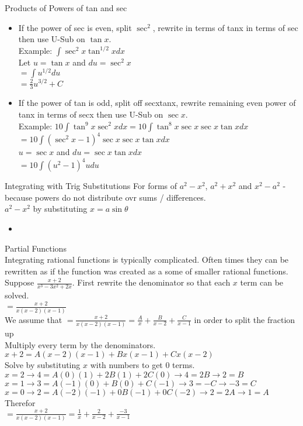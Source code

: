 \documentclass{article}
\begin{document}
\noindent
Products of Powers of tan and sec
\begin{itemize}
  \item If the power of sec is even, split $\sec^2$, rewrite in terms of tanx in terms of sec then use U-Sub on $\tan x$.\\
  Example: $\int{\sec^2x\tan^{1/2}x dx}$\\
  Let $u = \tan{x}$ and $du = \sec^2{x}$\\
  $= \int{u^{1/2}du}$\\
  $= \frac{2}{3}u^{3/2} + C$\\
  \item If the power of tan is odd, split off secxtanx, rewrite remaining even power of tanx in terms of secx then use U-Sub on $\sec{x}$.\\
  Example: $10\int{\tan^9{x}\sec^2{x}dx} = 10\int{\tan^8{x}\sec{x}\sec{x}\tan{x}dx}$\\
  $= 10\int{(\sec^2{x} - 1)^4 \sec{x}\sec{x}\tan{x} dx}$\\
  $u = \sec{x}$ and $du = \sec{x}\tan{x}dx$\\
  $= 10\int{(u^2 - 1)^4 u du}$\\
\end{itemize}

\noindent
\Large
Integrating with Trig Substitutions
\normalsize
\noindent
For forms of $a^2 - x^2$, $a^2 + x^2$ and $x^2 - a^2$ - because powers do not distribute ovr sums / differences.\\
$a^2 - x^2$ by substituting $x = a\sin{\theta}$
\begin{itemize}
  \item
\end{itemize}

\noindent
\Large
Partial Functions\\
\normalsize
\indent
Integrating rational functions is typically complicated. Often times they can be rewritten as if the function was created as a some of smaller rational functions. Suppose $\frac{x+2}{x^3 -3x^2 +2x}$. First rewrite the denominator so that each $x$ term can be solved.\\
$=\frac{x+2}{x(x-2)(x-1)}$\\
We assume that $=\frac{x+2}{x(x-2)(x-1)} = \frac{A}{x} + \frac{B}{x-2} + \frac{C}{x-1}$ in order to split the fraction up\\
Multiply every term by the denominators. $x+2 = A(x-2)(x-1) + Bx(x-1) + Cx(x-2)$\\
Solve by substituting $x$ with numbers to get 0 terms.\\
$x=2 \to 4 = A(0)(1) + 2B(1) + 2C(0) \to 4 = 2B \to 2 = B$\\
$x=1 \to 3 = A(-1)(0) + B(0) + C(-1) \to 3 = -C \to -3 = C$\\
$x=0 \to 2 = A(-2)(-1) + 0B(-1) + 0C(-2) \to 2 = 2A \to 1 = A$\\
Therefor\\
$=\frac{x+2}{x(x-2)(x-1)} = \frac{1}{x} + \frac{2}{x-2} + \frac{-3}{x-1}$\\
\end{document}
